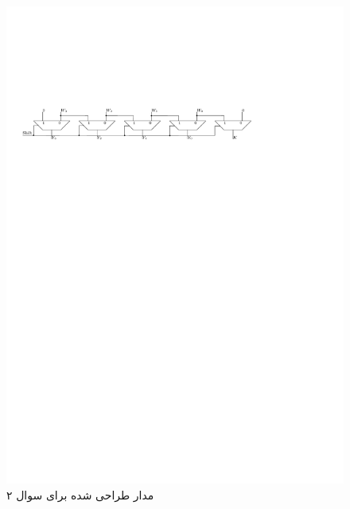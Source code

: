 

\begin{figure}[h]
	\centering
	\includegraphics[width=1\textwidth]{fig/Q2.pdf}
	\caption{مدار طراحی شده برای سوال ۲}
	\label{Q2_Design}
\end{figure}